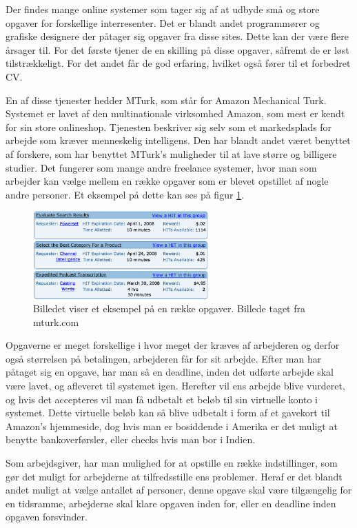 Der findes mange online systemer som tager sig af at udbyde små og store opgaver for forskellige interresenter. Det er blandt andet programmører og grafiske designere der påtager sig opgaver fra disse sites. Dette kan der være flere årsager til. For det første tjener de en skilling på disse opgaver, såfremt de er løst tilstrækkeligt. For det andet får de god erfaring, hvilket også fører til et forbedret CV.

En af disse tjenester hedder MTurk, som står for Amazon Mechanical Turk. Systemet er lavet af den multinationale virksomhed Amazon, som mest er kendt for sin store onlineshop. Tjenesten beskriver sig selv som et markedsplads for arbejde som kræver menneskelig intelligens.\cite{MTurk} Den har blandt andet været benyttet af forskere, som har benyttet MTurk's muligheder til at lave større og billigere studier.\cite{Sciencemag} Det fungerer som mange andre freelance systemer, hvor man som arbejder kan vælge mellem en række opgaver som er blevet opstillet af nogle andre personer. Et eksempel på dette kan ses på figur \ref{MTurkILL}.

\begin{figure}[H]
\centering
\includegraphics[width=0.6\textwidth]{Billeder/MTurk.png}
\caption{Billedet viser et eksempel på en række opgaver. Billede taget fra mturk.com\cite{MTurkIMG}}
\label{MTurkILL}
\end{figure}

Opgaverne er meget forskellige i hvor meget der kræves af arbejderen og derfor også størrelsen på betalingen, arbejderen får for sit arbejde. Efter man har påtaget sig en opgave, har man så en deadline, inden det udførte arbejde skal være lavet, og afleveret til systemet igen. Herefter vil ens arbejde blive vurderet, og hvis det accepteres vil man få udbetalt et beløb til sin virtuelle konto i systemet. Dette virtuelle beløb kan så blive udbetalt i form af et gavekort til Amazon’s hjemmeside, dog hvis man er bosiddende i Amerika er det muligt at benytte bankoverførsler, eller checks hvis man bor i Indien.\cite{MTurk2}

Som arbejdsgiver, har man mulighed for at opstille en række indstillinger, som gør det muligt for arbejderne at tilfredsstille ens problemer. Heraf er det blandt andet muligt at vælge antallet af personer, denne opgave skal være tilgængelig for en tidsramme, arbejderne skal klare opgaven inden for, eller en deadline inden opgaven forsvinder.

